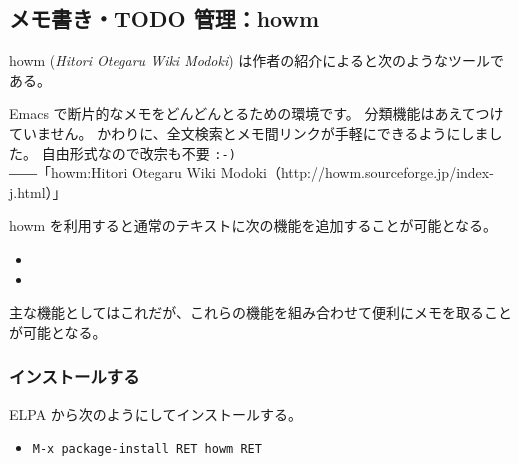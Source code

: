 \subsection{メモ書き・TODO 管理：howm}
howm (\emph{Hitori Otegaru Wiki Modoki}) は作者の紹介によると次のようなツールである。
\begin{mdframed}[roundcorner=0.50zw,leftmargin=3.00zw,rightmargin=3.00zw,skipabove=0.40zw,skipbelow=0.40zw,innertopmargin=4.00pt,innerbottommargin=4.00pt,innerleftmargin=5.00pt,innerrightmargin=5.0pt,linecolor=gray!100,linewidth=0.50pt,backgroundcolor=gray!00]
  Emacs で断片的なメモをどんどんとるための環境です。
  分類機能はあえてつけていません。
  かわりに、全文検索とメモ間リンクが手軽にできるようにしました。
  自由形式なので改宗も不要 \verb|:-)|\\
  ―\hspc{-1.00pt}―「howm:Hitori Otegaru Wiki Modoki（http://howm.sourceforge.jp/index-j.html）」
\end{mdframed}
howm を利用すると通常のテキストに次の機能を追加することが可能となる。
\begin{itemize}\setlength{\leftskip}{-1.00zw}%
\item {}
\item {}
\end{itemize}
主な機能としてはこれだが、これらの機能を組み合わせて便利にメモを取ることが可能となる。
\subsubsection{インストールする}
ELPA から次のようにしてインストールする。
\begin{itemize}\setlength{\leftskip}{-1.00zw}%
\item[] \texttt{M-x package-install RET howm RET}
\end{itemize}
